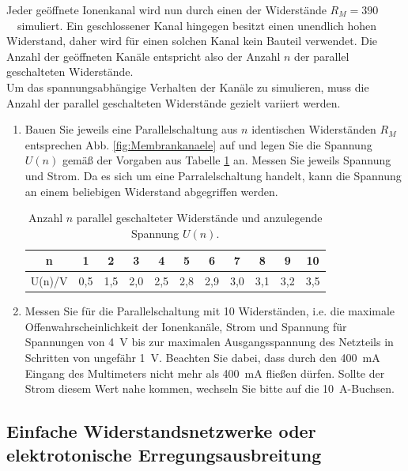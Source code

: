 Jeder geöffnete Ionenkanal wird nun durch einen der Widerstände $R_M=390$~\Ohm ~simuliert. Ein geschlossener Kanal hingegen besitzt einen unendlich hohen Widerstand, daher wird für einen solchen Kanal kein Bauteil verwendet. Die Anzahl der geöffneten Kanäle entspricht also der Anzahl $n$ der parallel geschalteten Widerstände.\\
Um das spannungsabhängige Verhalten der Kanäle zu simulieren, muss die Anzahl der parallel geschalteten Widerstände gezielt variiert werden. 
%
\begin{enumerate}
	\item Bauen Sie jeweils eine Parallelschaltung aus $n$ identischen Widerständen $R_M$ entsprechen Abb. \ref{fig:Membrankanaele} auf und legen Sie die Spannung $U(n)$ gemäß der Vorgaben aus Tabelle \ref{tab:bla} an. Messen Sie jeweils Spannung und Strom. Da es sich um eine Parralelschaltung handelt, kann die Spannung an einem beliebigen Widerstand abgegriffen werden.
	\begin{table}[h]
	 \centering
		 \begin{tabular}{c||c|c|c|c|c|c|c|c|c|c}
			 n & 1 & 2 & 3 & 4 & 5 & 6 & 7 & 8 & 9 & 10\\ \hline
			 U(n)/V & 0,5 & 1,5 & 2,0 & 2,5 & 2,8 & 2,9 & 3,0 & 3,1 & 3,2 & 3,5
			\end{tabular}
		\caption{Anzahl $n$ parallel geschalteter Widerstände und anzulegende Spannung $U(n)$.}
		\label{tab:bla}
	\end{table}
	\item Messen Sie für die Parallelschaltung mit 10 Widerständen, i.e. die maximale Offenwahrscheinlichkeit der Ionenkanäle, Strom und Spannung für Spannungen von 4~V bis zur maximalen Ausgangsspannung des Netzteils in Schritten von ungefähr 1~V. Beachten Sie dabei, dass durch den 400~mA Eingang des Multimeters nicht mehr als 400~mA fließen dürfen. Sollte der Strom diesem Wert nahe kommen, wechseln Sie bitte auf die 10~A-Buchsen.
\end{enumerate}

\subsection{Einfache Widerstandsnetzwerke oder elektrotonische Erregungsausbreitung}

